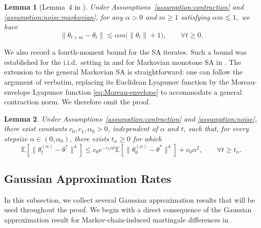\documentclass[11pt,letterpaper]{article}
\theoremstyle{plain}
\newtheorem{lemma}{Lemma}
\theoremstyle{definition}
\theoremstyle{remark}
\newcommand{\E}{\mathbb{E}}
\begin{document}
\begin{lemma}[Lemma~4 in \cite{chen2024lyapunov}]
\label{lem:increment-markovian}
Under Assumptions~\ref{assumption:contraction} and
\ref{assumption:noise:markovian}, for any \(\alpha>0\) and \(m\geq1\)
satisfying $\alpha m \lesssim 1,$ we have
\[
    \|\theta_{t+m}-\theta_t\|
    \lesssim
    \alpha m\bigl(\|\theta_t\|+1\bigr),
    \qquad \forall t\geq0.
\]
\end{lemma}
We also record a fourth-moment bound for the SA iterates. Such a bound was
established for the i.i.d.\ setting in \cite{zhang2024prelimit} and for
Markovian monotone SA in \cite{hadavi2026revisiting}. The extension to the
general Markovian SA is straightforward: one can follow the argument of
\cite{hadavi2026revisiting} verbatim, replacing its Euclidean Lyapunov
function by the Moreau-envelope Lyapunov function \eqref{eq:Moreau-envelope} to accommodate a general contraction norm.
We therefore omit the proof.

\begin{lemma}
\label{lem:fourthmoment}
Under Assumptions~\ref{assumption:contraction} and
\ref{assumption:noise}, there exist constants
\(c_0,c_1,\alpha_0>0\), independent of \(\alpha\) and \(t\), such that,
for every stepsize \(\alpha\in(0,\alpha_0)\), there exists
\(t_\alpha\geq0\) for which
\[
    \E\!\left[
        \|\theta_t^{(\alpha)}-\theta^*\|^4
    \right]
    \leq
    c_0 e^{-c_1\alpha t}
    \E\!\left[
        \|\theta_0^{(\alpha)}-\theta^*\|^4
    \right]
    +
    c_0\alpha^2,
    \qquad
    \forall t\geq t_\alpha.
\]
\end{lemma}


\subsection{Gaussian Approximation Rates}\label{sec:prior-GA}
In this subsection, we collect several Gaussian approximation results that
will be used throughout the proof. We begin with a direct consequence of the
Gaussian approximation result for Markov-chain-induced martingale differences
in \cite[Theorem~1]{zhang2026martingale}.
\end{document}
